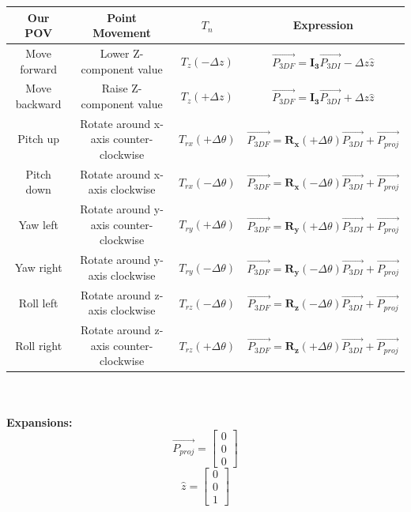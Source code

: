 \documentclass[11pt]{article}
\begin{document}
\noindent\hspace*{-2.7cm}
\begin{tabular}{ |c|c|c|c| }
	\hline
	Our POV & Point Movement & $T_n$ & Expression \\
	\hline\hline

	\rule{0pt}{3.0ex} Move forward & Lower Z-component value & $T_z(-\Delta z)$ &
	$\vec{P_{3DF}} = \mathbf{I_3}\vec{P_{3DI}} - \Delta z \hat{z}$ \\
	\hline

	\rule{0pt}{3.0ex} Move backward & Raise Z-component value & $T_z(+\Delta z)$ &
	$\vec{P_{3DF}} = \mathbf{I_3}\vec{P_{3DI}} + \Delta z \hat{z}$ \\
	\hline

	\rule{0pt}{3.0ex} Pitch up & Rotate around x-axis counter-clockwise &
	$T_{rx}(+\Delta\theta)$ &
	$\vec{P_{3DF}} = \mathbf{R_x}(+\Delta\theta)\vec{P_{3DI}} + \vec{P_{proj}}$ \\
	\hline

	\rule{0pt}{3.0ex} Pitch down & Rotate around x-axis clockwise &
	$T_{rx}(-\Delta\theta)$ &
	$\vec{P_{3DF}} = \mathbf{R_x}(-\Delta\theta)\vec{P_{3DI}} + \vec{P_{proj}}$ \\
	\hline

	\rule{0pt}{3.0ex} Yaw left & Rotate around y-axis counter-clockwise &
	$T_{ry}(+\Delta\theta)$ &
	$\vec{P_{3DF}} = \mathbf{R_y}(+\Delta\theta)\vec{P_{3DI}} + \vec{P_{proj}}$ \\
	\hline

	\rule{0pt}{3.0ex} Yaw right & Rotate around y-axis clockwise &
	$T_{ry}(-\Delta\theta)$ &
	$\vec{P_{3DF}} = \mathbf{R_y}(-\Delta\theta)\vec{P_{3DI}} + \vec{P_{proj}}$ \\
	\hline

	\rule{0pt}{3.0ex} Roll left & Rotate around z-axis clockwise &
	$T_{rz}(-\Delta\theta)$ &
	$\vec{P_{3DF}} = \mathbf{R_z}(-\Delta\theta)\vec{P_{3DI}} + \vec{P_{proj}}$ \\
	\hline

	\rule{0pt}{3.0ex} Roll right & Rotate around z-axis counter-clockwise &
	$T_{rz}(+\Delta\theta)$ &
	$\vec{P_{3DF}} = \mathbf{R_z}(+\Delta\theta)\vec{P_{3DI}} + \vec{P_{proj}}$ \\
	\hline

\end{tabular}
\\
\\

\textbf{Expansions:}
$$\vec{P_{proj}} = \begin{bmatrix} 0\\ 0\\ 0 \end{bmatrix}$$
$$\hat{z} = \begin{bmatrix} 0\\ 0\\ 1 \end{bmatrix}$$
\end{document}
